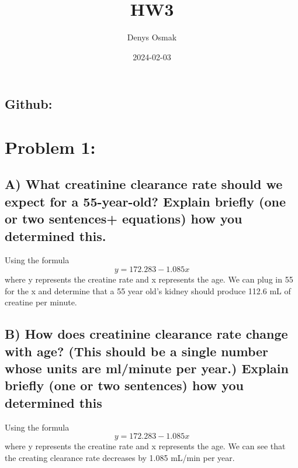 \documentclass[
]{article}
\title{HW3}
\author{Denys Osmak}
\date{2024-02-03}
\begin{document}
\maketitle

\hypertarget{github}{%
\subsection{Github:}\label{github}}

\hypertarget{problem-1}{%
\section{Problem 1:}\label{problem-1}}

\hypertarget{a-what-creatinine-clearance-rate-should-we-expect-for-a-55-year-old-explain-briefly-one-or-two-sentences-equations-how-you-determined-this.}{%
\subsection{A) What creatinine clearance rate should we expect for a
55-year-old? Explain briefly (one or two sentences+ equations) how you
determined
this.}\label{a-what-creatinine-clearance-rate-should-we-expect-for-a-55-year-old-explain-briefly-one-or-two-sentences-equations-how-you-determined-this.}}

Using the formula \[ y = 172.283 - 1.085x \] where y represents the
creatine rate and x represents the age. We can plug in 55 for the x and
determine that a 55 year old's kidney should produce 112.6 mL of
creatine per minute.

\hypertarget{b-how-does-creatinine-clearance-rate-change-with-age-this-should-be-a-single-number-whose-units-are-mlminute-per-year.-explain-briefly-one-or-two-sentences-how-you-determined-this}{%
\subsection{B) How does creatinine clearance rate change with age? (This
should be a single number whose units are ml/minute per year.) Explain
briefly (one or two sentences) how you determined
this}\label{b-how-does-creatinine-clearance-rate-change-with-age-this-should-be-a-single-number-whose-units-are-mlminute-per-year.-explain-briefly-one-or-two-sentences-how-you-determined-this}}

Using the formula \[ y = 172.283 - 1.085x \] where y represents the
creatine rate and x represents the age. We can see that the creating
clearance rate decreases by 1.085 mL/min per year.
\end{document}

